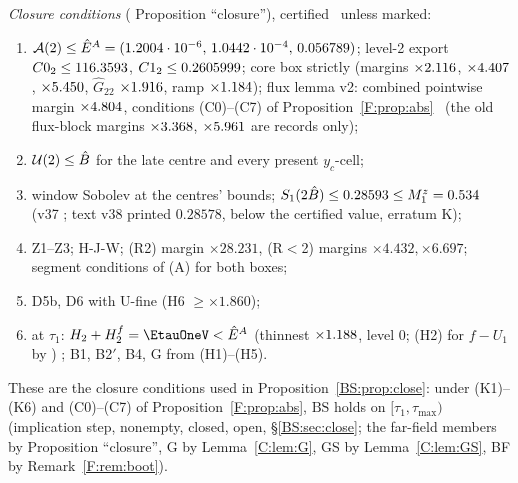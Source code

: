 \documentclass[11pt]{article}
\begin{document}
\noindent\emph{Closure conditions} ( Proposition ``closure''), certified \tC\ unless marked:
\begin{enumerate}[label=(K\arabic*),leftmargin=2.6em]
\item $\mathcal A(2)\le\hat E^A=(1.2004\cdot10^{-6},\,1.0442\cdot10^{-4},\,0.056789)$; level-2 export $C0_2\le116.3593$, $C1_2\le0.2605999$; core box strictly (margins $\times2.116$, $\times4.407$, $\times5.450$, $\hat G_{22}$ $\times1.916$, ramp $\times1.184$); flux lemma v2: combined pointwise margin $\times4.804$, conditions (C0)--(C7) of Proposition~\ref{F:prop:abs} \tC\ (the old flux-block margins $\times3.368$, $\times5.961$ are records only);
\item $\mathcal U(2)\le\hat B$ for the late centre and every present $y_c$-cell;
\item window Sobolev at the centres' bounds; $S_1(2\hat B)\le0.28593\le M_1^z=0.534$ (v37 ; text v38 printed $0.28578$, below the certified value, erratum K);
\item Z1--Z3; H-J-W; (R2) margin $\times28.231$, (R$<$2) margins $\times4.432,\times6.697$; segment conditions of (A) for both boxes;
\item D5b, D6 with U-fine (H6 $\ge\times1.860$);
\item at $\tau_1$: $H_2+H^f_2=\EtauOneV<\Eh$ (thinnest $\times1.188$, level 0; (H2) for $f-U_1$ by ) \tB; B1, B2$'$, B4, G from (H1)--(H5).
\end{enumerate}
These are the closure conditions used in Proposition~\ref{BS:prop:close}: under (K1)--(K6) and (C0)--(C7) of Proposition~\ref{F:prop:abs}, $\mathrm{BS}$ holds on $[\tau_1,\tau_{\max})$ (implication step, nonempty, closed, open, \S\ref{BS:sec:close}; the far-field members by  Proposition ``closure'', G by Lemma~\ref{C:lem:G}, GS by Lemma~\ref{C:lem:GS}, BF by Remark~\ref{F:rem:boot}).



\end{document}
